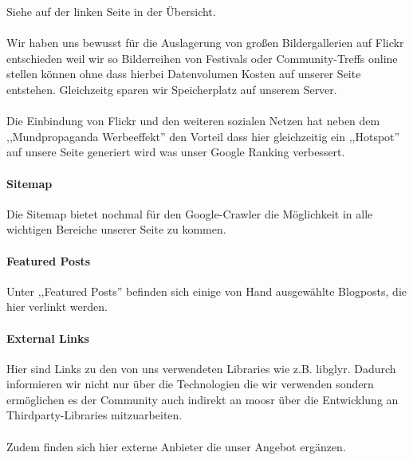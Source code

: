 Siehe auf der linken Seite in der Übersicht.
\\
\\
Wir haben uns bewusst für die Auslagerung von großen Bildergallerien auf Flickr
entschieden weil wir so Bilderreihen von Festivals oder Community-Treffs online
stellen können ohne dass hierbei Datenvolumen Kosten auf unserer Seite
entstehen. Gleichzeitg sparen wir Speicherplatz auf unserem Server.
\\
\\
Die Einbindung von Flickr und den weiteren sozialen Netzen hat neben dem
,,Mundpropaganda Werbeeffekt'' den Vorteil dass hier gleichzeitig ein
,,Hotspot'' auf unsere Seite generiert wird was unser Google Ranking verbessert.

\paragraph{Sitemap}
Die Sitemap bietet nochmal für den Google-Crawler die Möglichkeit in
alle wichtigen Bereiche unserer Seite zu kommen.
\paragraph{Featured Posts}
Unter ,,Featured Posts'' befinden sich einige von Hand ausgewählte Blogposts,
die hier verlinkt werden.

\paragraph{External Links}
Hier sind Links zu den von uns verwendeten Libraries wie z.B. libglyr. Dadurch
informieren wir nicht nur über die Technologien die wir verwenden sondern
ermöglichen es der Community auch indirekt an moosr über die Entwicklung an
Thirdparty-Libraries mitzuarbeiten.
\\
\\
Zudem finden sich hier externe Anbieter die unser Angebot ergänzen.
